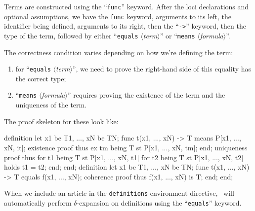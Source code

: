 \begin{node}[Functors]\label{mizar-000Z}%
Terms are constructed using the ``\texttt{func}'' keyword. After the
loci declarations and optional assumptions, we have the \texttt{func}
keyword, arguments to its left, the identifier being defined, arguments
to its right, then the ``\texttt{->}'' keyword, then the type of the
term, followed by either ``\texttt{equals} $\langle$\textit{term\/}$\rangle$''
or ``\texttt{means} $\langle$\textit{formula\/}$\rangle$''.

\begin{node}[Correctness]\label{mizar-0010}%
The correctness condition varies depending on how we're defining the
term:
\begin{enumerate}
\item for ``\texttt{equals} $\langle$\textit{term\/}$\rangle$'', we need
  to prove the right-hand side of this equality has the correct type;
\item ``\texttt{means} $\langle$\textit{formula\/}$\rangle$'' requires
  proving the existence of the term and the uniqueness of the term.
\end{enumerate}
The proof skeleton for these look like:
\begin{mizar}
definition
  let x1 be T1, ..., xN be TN;
  func t(x1, ..., xN) -> T means P[x1, ..., xN, it];
  existence
  proof
    thus ex tm being T st P[x1, ..., xN, tm];
  end;
  uniqueness
  proof
    thus for t1 being T st P[x1, ..., xN, t1]
         for t2 being T st P[x1, ..., xN, t2]
         holds t1 = t2;
  end;
end;
definition
  let x1 be T1, ..., xN be TN;
  func t(x1, ..., xN) -> T equals f(x1, ..., xN);
  coherence
  proof
    thus f(x1, ..., xN) is T;
  end;
end;
\end{mizar}
\end{node}
\begin{node}\label{mizar-0011}%
When we include an article in the \texttt{definitions} environment
directive, \Mizar\ will automatically perform $\delta$-expansion on
definitions using the ``\texttt{equals}'' keyword.
\end{node}
\end{node}

